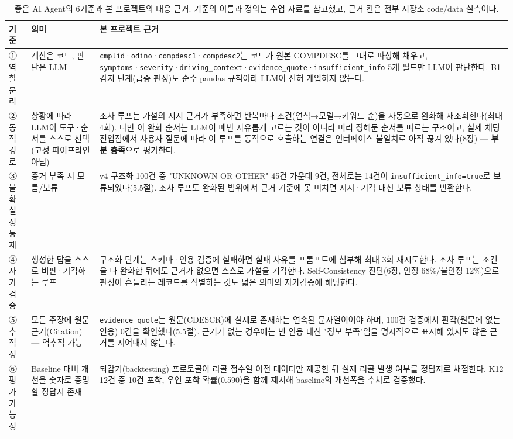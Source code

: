 \documentclass[11pt]{article}
\begin{document}
\begin{table}[H]
\centering
\small
\begin{tabular}{p{2.1cm}p{3.0cm}p{8.0cm}}
\toprule
기준 & 의미 & 본 프로젝트 근거 \\
\midrule
① 역할 분리 & 계산은 코드, 판단은 LLM &
\texttt{cmplid}·\texttt{odino}·\texttt{compdesc1}·\texttt{compdesc2}는 코드가 원본 COMPDESC를 그대로 파싱해 채우고, \texttt{symptoms}·\texttt{severity}·\texttt{driving\_context}·\texttt{evidence\_quote}·\texttt{insufficient\_info} 5개 필드만 LLM이 판단한다. B1 감지 단계(급증 판정)도 순수 pandas 규칙이라 LLM이 전혀 개입하지 않는다. \\
\addlinespace
② 동적 경로 & 상황에 따라 LLM이 도구·순서를 스스로 선택(고정 파이프라인 아님) &
조사 루프는 가설의 지지 근거가 부족하면 반복마다 조건(연식→모델→키워드 순)을 자동으로 완화해 재조회한다(최대 4회). 다만 이 완화 순서는 LLM이 매번 자유롭게 고르는 것이 아니라 미리 정해둔 순서를 따르는 구조이고, 실제 채팅 진입점에서 사용자 질문에 따라 이 루프를 동적으로 호출하는 연결은 인터페이스 불일치로 아직 끊겨 있다(8장) — \textbf{부분 충족}으로 평가한다. \\
\addlinespace
③ 불확실성 통제 & 증거 부족 시 모름/보류 &
v4 구조화 100건 중 "UNKNOWN OR OTHER" 45건 가운데 9건, 전체로는 14건이 \texttt{insufficient\_info=true}로 보류되었다(5.5절). 조사 루프도 완화된 범위에서 근거 기준에 못 미치면 지지·기각 대신 보류 상태를 반환한다. \\
\addlinespace
④ 자가 검증 & 생성한 답을 스스로 비판·기각하는 루프 &
구조화 단계는 스키마·인용 검증에 실패하면 실패 사유를 프롬프트에 첨부해 최대 3회 재시도한다. 조사 루프는 조건을 다 완화한 뒤에도 근거가 없으면 스스로 가설을 기각한다. Self-Consistency 진단(6장, 안정 68\%/불안정 12\%)으로 판정이 흔들리는 레코드를 식별하는 것도 넓은 의미의 자가검증에 해당한다. \\
\addlinespace
⑤ 추적성 & 모든 주장에 원문 근거(Citation) — 역추적 가능 &
\texttt{evidence\_quote}는 원문(CDESCR)에 실제로 존재하는 연속된 문자열이어야 하며, 100건 검증에서 환각(원문에 없는 인용) 0건을 확인했다(5.5절). 근거가 없는 경우에는 빈 인용 대신 "정보 부족"임을 명시적으로 표시해 있지도 않은 근거를 지어내지 않는다. \\
\addlinespace
⑥ 평가 가능성 & Baseline 대비 개선을 숫자로 증명할 정답지 존재 &
되감기(backtesting) 프로토콜이 리콜 접수일 이전 데이터만 제공한 뒤 실제 리콜 발생 여부를 정답지로 채점한다. K12 12건 중 10건 포착, 우연 포착 확률(0.590)을 함께 제시해 baseline의 개선폭을 수치로 검증했다. \\
\bottomrule
\end{tabular}
\caption{좋은 AI Agent의 6기준과 본 프로젝트의 대응 근거. 기준의 이름과 정의는 수업 자료를 참고했고, 근거 칸은 전부 저장소 code/data 실측이다.}
\label{tab:agent-criteria}
\end{table}
\end{document}
